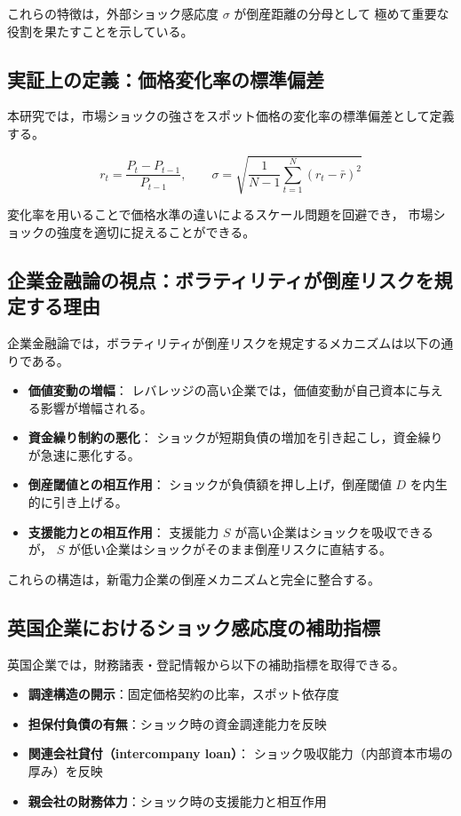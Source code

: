これらの特徴は，外部ショック感応度 $\sigma$ が倒産距離の分母として
極めて重要な役割を果たすことを示している。

\subsection{実証上の定義：価格変化率の標準偏差}

本研究では，市場ショックの強さをスポット価格の変化率の標準偏差として定義する。



\[
r_t = \frac{P_t - P_{t-1}}{P_{t-1}}, \qquad
\sigma = \sqrt{\frac{1}{N-1}\sum_{t=1}^{N}(r_t - \bar{r})^2}
\]



変化率を用いることで価格水準の違いによるスケール問題を回避でき，
市場ショックの強度を適切に捉えることができる。

\subsection{企業金融論の視点：ボラティリティが倒産リスクを規定する理由}

企業金融論では，ボラティリティが倒産リスクを規定するメカニズムは以下の通りである。

\begin{itemize}
    \item \textbf{価値変動の増幅}：
          レバレッジの高い企業では，価値変動が自己資本に与える影響が増幅される。
    \item \textbf{資金繰り制約の悪化}：
          ショックが短期負債の増加を引き起こし，資金繰りが急速に悪化する。
    \item \textbf{倒産閾値との相互作用}：
          ショックが負債額を押し上げ，倒産閾値 $D$ を内生的に引き上げる。
    \item \textbf{支援能力との相互作用}：
          支援能力 $S$ が高い企業はショックを吸収できるが，
          $S$ が低い企業はショックがそのまま倒産リスクに直結する。
\end{itemize}

これらの構造は，新電力企業の倒産メカニズムと完全に整合する。

\subsection{英国企業におけるショック感応度の補助指標}

英国企業では，財務諸表・登記情報から以下の補助指標を取得できる。

\begin{itemize}
    \item \textbf{調達構造の開示}：固定価格契約の比率，スポット依存度
    \item \textbf{担保付負債の有無}：ショック時の資金調達能力を反映
    \item \textbf{関連会社貸付（intercompany loan）}：
          ショック吸収能力（内部資本市場の厚み）を反映
    \item \textbf{親会社の財務体力}：ショック時の支援能力と相互作用
\end{itemize}


